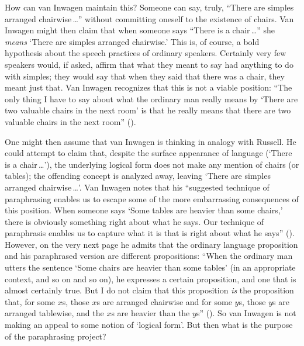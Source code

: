 \documentclass[11pt]{article}
\begin{document}
\begin{spacing}{1.5}
How can van Inwagen maintain this?  Someone can say, truly, ``There
are simples arranged chairwise\,\ldots '' without committing oneself
to the existence of chairs.  Van Inwagen might then claim that when
someone says ``There is a chair\,\ldots '' she {\em means} `There are
simples arranged chairwise.'  This is, of course, a bold hypothesis
about the speech practices of ordinary speakers.  Certainly very few
speakers would, if asked, affirm that what they meant to say had
anything to do with simples; they would say that when they said that
there was a chair, they meant just that.  Van Inwagen recognizes that
this is not a viable position: ``The only thing I have to say about
what the ordinary man really means by `There are two valuable chairs
in the next room' is that he really means that there are two valuable
chairs in the next room'' (\citeyear[106]{inwagen1995}).

One might then assume that van Inwagen is thinking in analogy with
Russell.  He could attempt to claim that, despite the surface
appearance of language (`There is a chair\,\ldots '), the underlying
logical form does not make any mention of chairs (or tables); the
offending concept is analyzed away, leaving `There are simples
arranged chairwise\,\ldots '.  Van Inwagen notes that his ``suggested
technique of paraphrasing enables us to escape some of the more
embarrassing consequences of this position.  When someone says `Some
tables are heavier than some chairs,' there is obviously something
right about what he says.  Our technique of paraphrasis enables us to
capture what it is that is right about what he says''
(\citeyear[111]{inwagen1995}).  However, on the very next page he
admits that the ordinary language proposition and his paraphrased
version are different propositions: ``When the ordinary man utters the
sentence `Some chairs are heavier than some tables' (in an appropriate
context, and so on and so on), he expresses a certain proposition, and
one that is almost certainly true.  But I do not claim that this
proposition {\em is} the proposition that, for some $x$s, those $x$s
are arranged chairwise and for some $y$s, those $y$s are arranged
tablewise, and the $x$s are heavier than the $y$s''
(\citeyear[112]{inwagen1995}).  So van Inwagen is not making an appeal
to some notion of `logical form'.  But then what is the purpose of the
paraphrasing project?


\end{spacing}
\end{document}
